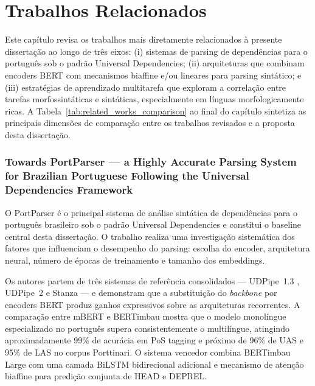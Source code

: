 
\chapter{Trabalhos Relacionados}
\label{cap:relacionados}

Este capítulo revisa os trabalhos mais diretamente relacionados à presente dissertação
ao longo de três eixos: (i) sistemas de parsing de dependências para o português sob o
padrão Universal Dependencies; (ii) arquiteturas que combinam encoders BERT com mecanismos
biaffine e/ou lineares para parsing sintático; e (iii) estratégias de aprendizado
multitarefa que exploram a correlação entre tarefas morfossintáticas e sintáticas,
especialmente em línguas morfologicamente ricas. A Tabela~\ref{tab:related_works_comparison}
ao final do capítulo sintetiza as principais dimensões de comparação entre os trabalhos
revisados e a proposta desta dissertação.

\subsection*{Towards PortParser — a Highly Accurate Parsing System for Brazilian Portuguese
             Following the Universal Dependencies Framework}

O PortParser \cite{lopes2024towards} é o principal sistema de análise sintática de
dependências para o português brasileiro sob o padrão Universal Dependencies e constitui
o baseline central desta dissertação. O trabalho realiza uma investigação sistemática dos
fatores que influenciam o desempenho do parsing: escolha do encoder, arquitetura neural,
número de épocas de treinamento e tamanho dos embeddings.

Os autores partem de três sistemas de referência consolidados — UDPipe~1.3
\cite{straka2017tokenizing}, UDPipe~2 e Stanza \cite{qi-etal-2020-stanza} — e demonstram
que a substituição do \textit{backbone} por encoders BERT produz ganhos expressivos sobre
as arquiteturas recorrentes. A comparação entre mBERT \cite{devlin2019bert} e BERTimbau
\cite{souza2020bertimbau} mostra que o modelo monolíngue especializado no português supera
consistentemente o multilíngue, atingindo aproximadamente 99\% de acurácia em PoS tagging
e próximo de 96\% de UAS e 95\% de LAS no corpus Porttinari. O sistema vencedor combina
BERTimbau Large com uma camada BiLSTM bidirecional adicional e mecanismo de atenção
biaffine \cite{dozat2016deep} para predição conjunta de HEAD e DEPREL.

